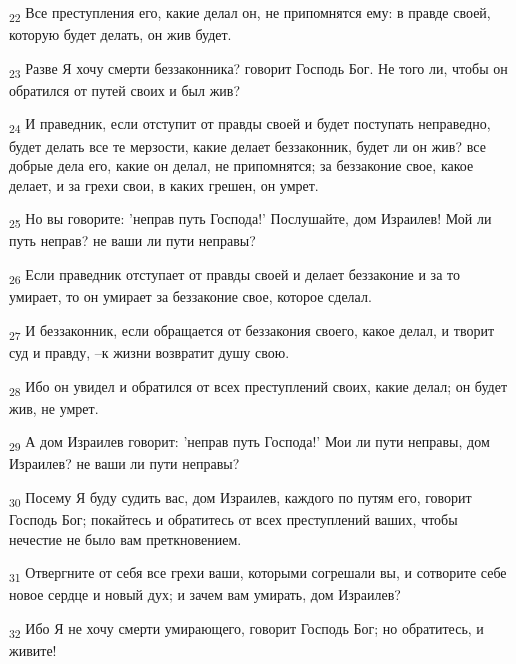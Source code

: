 \begin{tcolorbox}
\textsubscript{22} Все преступления его, какие делал он, не припомнятся ему: в правде своей, которую будет делать, он жив будет.
\end{tcolorbox}
\begin{tcolorbox}
\textsubscript{23} Разве Я хочу смерти беззаконника? говорит Господь Бог. Не того ли, чтобы он обратился от путей своих и был жив?
\end{tcolorbox}
\begin{tcolorbox}
\textsubscript{24} И праведник, если отступит от правды своей и будет поступать неправедно, будет делать все те мерзости, какие делает беззаконник, будет ли он жив? все добрые дела его, какие он делал, не припомнятся; за беззаконие свое, какое делает, и за грехи свои, в каких грешен, он умрет.
\end{tcolorbox}
\begin{tcolorbox}
\textsubscript{25} Но вы говорите: 'неправ путь Господа!' Послушайте, дом Израилев! Мой ли путь неправ? не ваши ли пути неправы?
\end{tcolorbox}
\begin{tcolorbox}
\textsubscript{26} Если праведник отступает от правды своей и делает беззаконие и за то умирает, то он умирает за беззаконие свое, которое сделал.
\end{tcolorbox}
\begin{tcolorbox}
\textsubscript{27} И беззаконник, если обращается от беззакония своего, какое делал, и творит суд и правду, --к жизни возвратит душу свою.
\end{tcolorbox}
\begin{tcolorbox}
\textsubscript{28} Ибо он увидел и обратился от всех преступлений своих, какие делал; он будет жив, не умрет.
\end{tcolorbox}
\begin{tcolorbox}
\textsubscript{29} А дом Израилев говорит: 'неправ путь Господа!' Мои ли пути неправы, дом Израилев? не ваши ли пути неправы?
\end{tcolorbox}
\begin{tcolorbox}
\textsubscript{30} Посему Я буду судить вас, дом Израилев, каждого по путям его, говорит Господь Бог; покайтесь и обратитесь от всех преступлений ваших, чтобы нечестие не было вам преткновением.
\end{tcolorbox}
\begin{tcolorbox}
\textsubscript{31} Отвергните от себя все грехи ваши, которыми согрешали вы, и сотворите себе новое сердце и новый дух; и зачем вам умирать, дом Израилев?
\end{tcolorbox}
\begin{tcolorbox}
\textsubscript{32} Ибо Я не хочу смерти умирающего, говорит Господь Бог; но обратитесь, и живите!
\end{tcolorbox}
